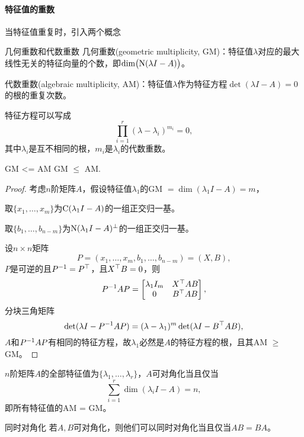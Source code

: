 \paragraph{特征值的重数}

当特征值重复时，引入两个概念
\begin{definition}{几何重数和代数重数}{}
	几何重数(geometric multiplicity, GM)：特征值$\lambda$对应的最大线性无关的特征向量的个数，即$\dim\bigl(\operatorname{N}(\lambda I-A)\bigr)$。

	代数重数(algebraic multiplicity, AM)：特征值$\lambda$作为特征方程$\det(\lambda I-A)=0$的根的重复次数。
\end{definition}
特征方程可以写成
\[
	\prod_{i=1}^r(\lambda-\lambda_i)^{m_i}=0,
\]
其中$\lambda_i$是互不相同的根，$m_i$是$\lambda_i$的代数重数。
\begin{theorem}{}{GM <= AM}
	GM $\leqslant$ AM.
\end{theorem}
\begin{proof}
	考虑$n$阶矩阵$A$，假设特征值$\lambda_1$的GM $=\dim(\lambda_1I-A)=m$，
	
	取$\{x_1,\ldots,x_m\}$为$\operatorname{C}(\lambda_1I-A)$的一组正交归一基。
	
	取$\{b_1,\ldots,b_{n-m}\}$为$\operatorname{N}(\lambda_1I-A)^\perp$的一组正交归一基。
	
	设$n\times n$矩阵 
	\[
		P=(x_1,\ldots,x_m,b_1,\ldots,b_{n-m})=(X,B),
	\]
	$P$是可逆的且$P^{-1}=P^\top$，且$X^\top B=0$，则 
	\[
		P^{-1} AP=\begin{bmatrix}
			\lambda_1I_m&X^\top AB\\0&B^\top AB
		\end{bmatrix},
	\]
	分块三角矩阵
	\[
		\det(\lambda I-P^{-1} AP)=(\lambda-\lambda_1)^m\det(\lambda I-B^\top AB),
	\]
	$A$和$P^{-1} AP$有相同的特征方程，故$\lambda_1$必然是$A$的特征方程的根，且其AM $\geqslant$ GM。
\end{proof}
\begin{corollary}
	$n$阶矩阵$A$的全部特征值为$\{\lambda_1,\ldots,\lambda_r\}$，$A$可对角化当且仅当
	\[
		\sum_{i=1}^r\dim(\lambda_iI-A)=n,
	\]
	即所有特征值的AM = GM。
\end{corollary}
\begin{theorem}{同时对角化}{}
	若$A,B$可对角化，则他们可以同时对角化当且仅当$AB=BA$。
\end{theorem}
